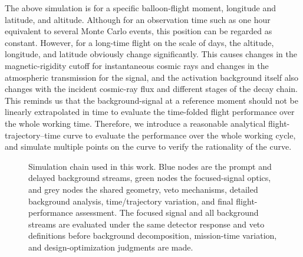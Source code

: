 \documentclass[pdflatex,sn-mathphys-num]{sn-jnl}
\begin{document}
The above simulation is for a specific balloon-flight moment, longitude and latitude, and altitude. Although for an observation time such as one hour equivalent to several Monte Carlo events, this position can be regarded as constant. However, for a long-time flight on the scale of days, the altitude, longitude, and latitude obviously change significantly. This causes changes in the magnetic-rigidity cutoff for instantaneous cosmic rays and changes in the atmospheric transmission for the signal, and the activation background itself also changes with the incident cosmic-ray flux and different stages of the decay chain. This reminds us that the background-signal at a reference moment should not be linearly extrapolated in time to evaluate the time-folded flight performance over the whole working time. Therefore, we introduce a reasonable analytical flight-trajectory--time curve to evaluate the performance over the whole working cycle, and simulate multiple points on the curve to verify the rationality of the curve.

\begin{figure}[t]
\centering
{}
\caption{Simulation chain used in this work. Blue nodes are the prompt and
delayed background streams, green nodes the focused-signal optics, and grey
nodes the shared geometry, veto mechanisms, detailed background analysis,
time/trajectory variation, and final flight-performance assessment. The focused
signal and all background streams are evaluated under the same detector response
and veto definitions before background decomposition, mission-time variation,
and design-optimization judgments are made.}
\label{fig:workflow}
\end{figure}
\end{document}
